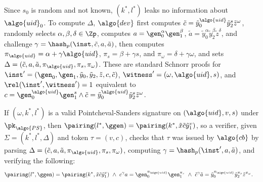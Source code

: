     Since $s_0$ is random and not known, $(k^*, l^*)$ leaks no information
    about $\algo{uid}_0$. To compute $\Delta$, $\algo{dev}$ first computes
    $\tilde{c} = \tilde{y}_0^{\algo{uid}} \tilde{y}_2^s \tilde{z}^\omega$,
    randomly selects $\alpha, \beta, \delta \in \Zp$, computes $a =
    \gen_0^\alpha \gen_1^\beta$, $\tilde{a} = \tilde{y}_0^\alpha
    \tilde{y}_2^\beta \tilde{z}^\delta$, and challenge $\gamma = \hash_p(\inst,
    \tilde{c}, a, \tilde{a})$, then computes $\pi_{\algo{uid}} = \alpha +
    \gamma \algo{uid}$, $\pi_s = \beta + \gamma s$, and $\pi_\omega = \delta +
    \gamma \omega$, and sets $\Delta = (\tilde{c}, a, \tilde{a},
    \pi_{\algo{uid}}, \pi_s, \pi_\omega)$. These are standard Schnorr proofs
    for $\inst' = (\gen_0, \gen_1, \tilde{y}_0, \tilde{y}_2, \tilde{z}, c,
    \tilde{c})$, $\witness' = (\omega, \algo{uid}, s)$, and $\rel(\inst',
    \witness') = 1$ equivalent to $c = \gen_0^{\algo{uid}} \gen_1^s \wedge
    \tilde{c} = \tilde{y}_0^{\algo{uid}} \tilde{y}_2^s \tilde{z}^\omega$.

    If $(\omega, k^*, l^*)$ is a valid Pointcheval-Sanders signature on
    $(\algo{uid}, v, s)$ under $\pk_{\algo{PS}}$, then $\pairing(l^*, \ggen) =
    \pairing(k^*, \tilde{x} \tilde{c} \tilde{y}_1^v)$, so a verifier, given
    $\Sigma = (k^*, l^*, \Delta)$ and token $\tau = (v, c)$, checks that $\tau$
    was issued by $\algo{cb}$ by parsing $\Delta = (\tilde{c}, a, \tilde{a},
    \pi_{\algo{uid}}, \pi_s, \pi_\omega)$, computing $\gamma = \hash_p(\inst',
    a, \tilde{a})$, and verifying the following:
%
    \begin{align*}
%
      \pairing(l^*, \ggen) &= \pairing(k^*, \tilde{x} \tilde{c} \tilde{y}_1^v)
      \ \wedge \ c^\gamma a = \gen_0^{\pi_{\algo{uid}}} \gen_1^{\pi_s} \ \wedge
      \ \tilde{c}^\gamma \tilde{a} = \tilde{y}_0^{\pi_{\algo{uid}}}
      \tilde{y}_2^{\pi_s} \tilde{z}^{\pi_\omega}.
    \end{align*}
